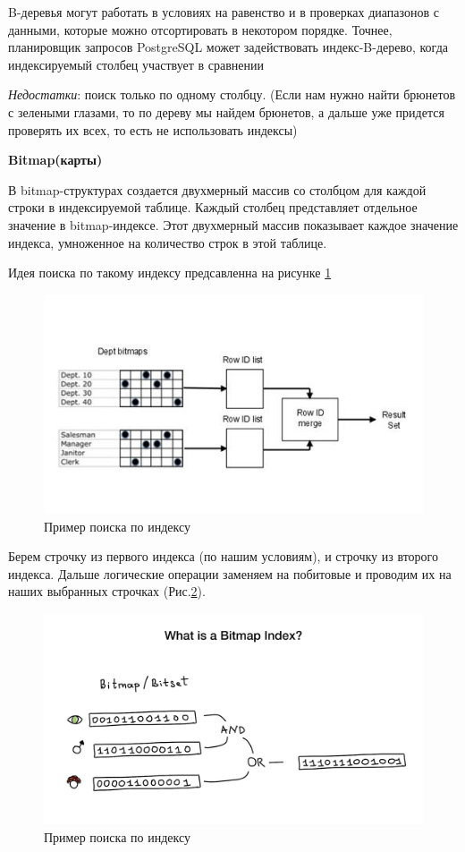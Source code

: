 B-деревья могут работать в условиях на равенство и в проверках диапазонов с данными, которые можно отсортировать в некотором порядке. Точнее, планировщик запросов PostgreSQL может задействовать индекс-B-дерево, когда индексируемый столбец участвует в сравнении 

\textit{Недостатки}: поиск только по одному столбцу. (Если нам нужно найти брюнетов с зелеными глазами, то по дереву мы найдем брюнетов, а дальше уже придется проверять их всех, то есть не использовать индексы)

\textbf{Bitmap(карты)} 

В bitmap-структурах создается двухмерный массив со столбцом для каждой строки в индексируемой таблице. Каждый столбец представляет отдельное значение в bitmap-индексе. Этот двухмерный массив показывает каждое значение индекса, умноженное на количество строк в этой таблице.

Идея поиска по такому индексу предсавленна на рисунке \ref{fig:Map}  

\begin{figure}[!h]
    \centering
    \includegraphics[scale = 0.3]{4/Map.jpeg}
    \caption{Пример поиска по индексу}
    \label{fig:Map}
\end{figure}


Берем строчку из первого индекса (по нашим условиям), и строчку из второго индекса. Дальше логические операции заменяем на побитовые и проводим их на наших выбранных строчках (Рис.\ref{fig:BMap}).

\begin{figure}[!h]
    \centering
    \includegraphics[scale = 0.3]{4/BitMat.png}
    \caption{Пример поиска по индексу}
    \label{fig:BMap}
\end{figure}

